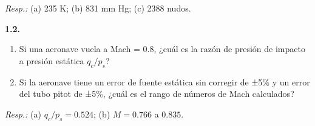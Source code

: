 \textit{Resp.:} (a) 235 K; (b) 831 mm Hg; (c) 2388 nudos.

\vspace{1em}

\textbf{1.2.}  
\begin{enumerate}[label=(\alph*)]
    \item Si una aeronave vuela a Mach = 0.8, ¿cuál es la razón de presión de impacto a presión estática \( q_c / p_s \)?
    \item Si la aeronave tiene un error de fuente estática sin corregir de ±5\% y un error del tubo pitot de ±5\%, ¿cuál es el rango de números de Mach calculados?
\end{enumerate}

\textit{Resp.:} (a) \( q_c / p_s = 0.524 \); (b) \( M = 0.766 \) a \( 0.835 \).
